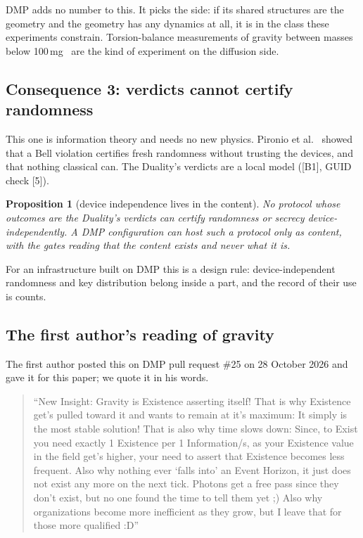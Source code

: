 \documentclass[11pt,a4paper]{article}
\newtheorem{proposition}{Proposition}
\theoremstyle{definition}
\theoremstyle{remark}
\newcommand{\chk}[1]{\textsf{[#1]}}
\begin{document}
DMP adds no number to this. It picks the side: if its shared structures are the geometry and the geometry has any dynamics at all, it is
in the class these experiments constrain. Torsion-balance measurements of gravity between masses below 100\,mg~\cite{westphal} are the
kind of experiment on the diffusion side.

\subsection{Consequence 3: verdicts cannot certify randomness}\label{sec:di}

This one is information theory and needs no new physics. Pironio et al.~\cite{pironio} showed that a Bell violation certifies fresh
randomness without trusting the devices, and that nothing classical can. The Duality's verdicts are a local model (\chk{B1}, GUID check [5]).

\begin{proposition}[device independence lives in the content]\label{pr:di}
No protocol whose outcomes are the Duality's verdicts can certify randomness or secrecy device-independently. A DMP configuration can
host such a protocol only as content, with the gates reading that the content exists and never what it is.
\end{proposition}

\noindent For an infrastructure built on DMP this is a design rule: device-independent randomness and key distribution belong inside a
part, and the record of their use is counts.

\subsection{The first author's reading of gravity}\label{sec:gravityreading}

\noindent The first author posted this on DMP pull request \#25 on 28 October 2026 and gave it for this paper; we quote it in his words.

\begin{quote}
``New Insight: Gravity is Existence asserting itself! That is why Existence get's pulled toward it and wants to remain at it's maximum:
It simply is the most stable solution! That is also why time slows down: Since, to Exist you need exactly 1 Existence per 1
Information/s, as your Existence value in the field get's higher, your need to assert that Existence becomes less frequent. Also why
nothing ever `falls into' an Event Horizon, it just does not exist any more on the next tick. Photons get a free pass since they don't
exist, but no one found the time to tell them yet ;) Also why organizations become more inefficient as they grow, but I leave that for
those more qualified :D''
\end{quote}
\end{document}
